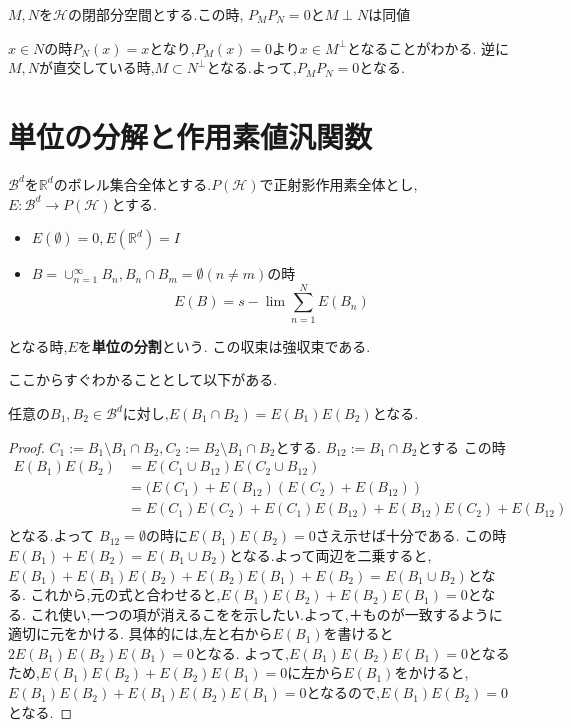 \documentclass[uplatex]{jsbook}
\begin{document}
\begin{prop}
$M, N$を$\mathcal{H}$の閉部分空間とする.この時,
$P_M P_N = 0$と$M \perp N$は同値
\end{prop}
$x \in N$の時$P_N(x) = x$となり,$P_M(x) = 0$より$x \in M^{\perp}$となることがわかる.
逆に$M, N$が直交している時,$M \subset N^{\perp}$となる.よって,$P_MP_N = 0$となる.

\section{単位の分解と作用素値汎関数}
\begin{screen}
\begin{dfn}
$\mathcal{B}^d$を$\mathbb{R}^d$のボレル集合全体とする.$P(\mathcal{H})$で正射影作用素全体とし,
$E: \mathcal{B}^{d} \to P(\mathcal{H})$とする.
\begin{itemize}
  \item $E(\emptyset) = 0, E(\mathbb{R}^d) = I$
  \item $B = \cup_{n=1}^{\infty} B_n,B_n \cap B_m = \emptyset (n \neq m) $の時
  \begin{equation*}
  E(B) = s- \lim \sum_{n=1}^N E(B_n)
  \end{equation*}
\end{itemize}
となる時,$E$を\textbf{単位の分割}という.
この収束は強収束である.
\end{dfn}
\end{screen}

ここからすぐわかることとして以下がある.
\begin{lem}
  任意の$B_1,B_2 \in \mathcal{B}^{d}$に対し,$E(B_1 \cap B_2) = E(B_1)E(B_2)$となる.
\end{lem}
\begin{proof}
  $C_1:= B_1 \setminus B_1 \cap B_2, C_2 := B_2 \setminus B_1 \cap B_2$とする.
  $B_{12}:= B_1 \cap B_2$とする
  この時
  \begin{align*}
   E(B_1)E(B_2)& = E(C_1 \cup B_{12})E(C_2 \cup B_{12}) \\
                           & = (E(C_1) +E(B_{12})(E(C_2) + E(B_{12})) \\
                           & = E(C_1)E(C_2) + E(C_1)E(B_{12}) + E(B_{12})E(C_2) + E(B_{12})\\
\end{align*}
となる.よって $B_{12} = \emptyset$の時に$E(B_1)E(B_2) = 0$さえ示せば十分である.
この時$E(B_1) +E(B_2) = E(B_1 \cup B_2)$となる.よって両辺を二乗すると,
$E(B_1) + E(B_1)E(B_2) + E(B_2)E(B_1) + E(B_2) = E(B_1 \cup B_2)$となる.
これから,元の式と合わせると,$E(B_1)E(B_2) + E(B_2)E(B_1) = 0$となる.
これ使い,一つの項が消えるこをを示したい.よって,＋ものが一致するように適切に元をかける.
具体的には,左と右から$E(B_1)$を書けると$2 E(B_1)E(B_2)E(B_1) = 0$となる.
よって,$E(B_1)E(B_2)E(B_1) = 0$となるため,$E(B_1)E(B_2) + E(B_2)E(B_1) = 0$に左から$E(B_1)$をかけると,
$E(B_1)E(B_2) +E(B_1)E(B_2)E(B_1) = 0$となるので,$E(B_1)E(B_2) = 0$となる.
\end{proof}
\end{document}
